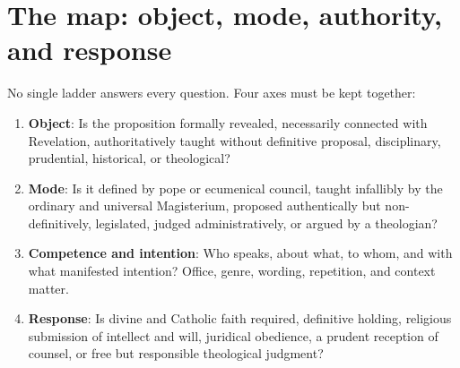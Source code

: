 \section{The map: object, mode, authority, and response}

No single ladder answers every question. Four axes must be kept together:

\begin{enumerate}
\item \textbf{Object}: Is the proposition formally revealed, necessarily
connected with Revelation, authoritatively taught without definitive
proposal, disciplinary, prudential, historical, or theological?
\item \textbf{Mode}: Is it defined by pope or ecumenical council, taught
infallibly by the ordinary and universal Magisterium, proposed authentically
but non-definitively, legislated, judged administratively, or argued by a
theologian?
\item \textbf{Competence and intention}: Who speaks, about what, to whom, and
with what manifested intention? Office, genre, wording, repetition, and
context matter.
\item \textbf{Response}: Is divine and Catholic faith required, definitive
holding, religious submission of intellect and will, juridical obedience, a
prudent reception of counsel, or free but responsible theological judgment?
\end{enumerate}

